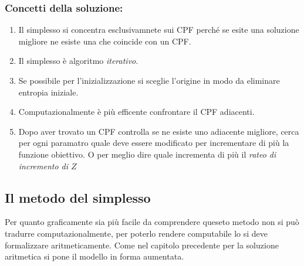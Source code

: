 \documentclass{article}
\begin{document}
\subsubsection{Concetti della soluzione:}
\begin{enumerate}
  \item Il simplesso si concentra esclusivamnete sui CPF perché se esite una soluzione migliore ne esiste una che coincide con un CPF.
  \item Il simplesso è algoritmo \textit{iterativo}.
        \usetikzlibrary {calc,positioning,shapes.misc}
  \item Se possibile per l'inizializzazione si sceglie l'origine in modo da eliminare entropia iniziale.
  \item Computazionalmente è più efficente confrontare il CPF adiacenti.
  \item Dopo aver trovato un CPF controlla se ne esiste uno adiacente migliore, cerca per ogni paramatro quale deve essere modificato per incrementare di più la funzione obiettivo. O per meglio dire quale incrementa di più il \textit{rateo di incremento di $Z$}

\end{enumerate}
\subsection{Il metodo del simplesso}
Per quanto graficamente sia più facile da comprendere queseto metodo non si può tradurre computazionalmente, per poterlo rendere computabile lo si deve formalizzare aritmeticamente. Come nel capitolo precedente per la soluzione aritmetica si pone il modello in forma aumentata.
\end{document}
